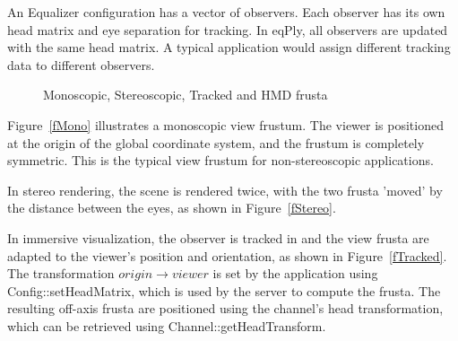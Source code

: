 \documentclass[10pt,a4]{scrartcl}
\newcommand{\fig}[1]{Figure~\ref{#1}}
\begin{document}
An Equalizer configuration has a vector of observers. Each observer has
its own head matrix and eye separation for tracking. In \textsf{eqPly},
all observers are updated with the same head matrix. A typical
application would assign different tracking data to different observers.

\begin{figure}[h!t]
  \hfil
  \hfil
  {\caption{\label{fImmersive}Monoscopic, Stereoscopic, Tracked and HMD
    frusta}}
\end{figure}

\fig{fMono} illustrates a monoscopic view frustum. The viewer is
positioned at the origin of the global coordinate system, and the
frustum is completely symmetric. This is the typical view frustum for
non-stereoscopic applications.

In stereo rendering, the scene is rendered twice, with the two frusta
'moved' by the distance between the eyes, as shown in \fig{fStereo}.

In immersive visualization, the observer is tracked in and the view
frusta are adapted to the viewer's position and orientation, as shown
in \fig{fTracked}. The transformation $origin \rightarrow viewer$ is set by
the application using \textsf{Config::setHead\-Matrix}, which is used by
the server to compute the frusta. The resulting off-axis frusta are
positioned using the channel's head transformation, which can be
retrieved using \textsf{Channel::getHeadTransform}.
\end{document}
